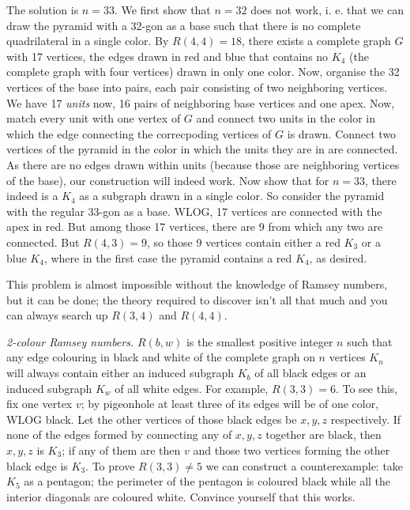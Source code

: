 \begin{solution}\hfil\medskip
  
    The solution is $n=\boxed{33}$.
    We first show that $n=32$ does not work, i. e. that we can draw the pyramid with a 32-gon as a base such that there is no complete quadrilateral in a single color. By $R(4,4)=18$, there exists a complete graph $G$ with 17 vertices, the edges drawn in red and blue that contains no $K_4$ (the complete graph with four vertices) drawn in only one color. Now, organise the 32 vertices of the base into pairs, each pair consisting of two neighboring vertices. We have 17 \emph{units} now, 16 pairs of neighboring base vertices and one apex. Now, match every unit with one vertex of $G$ and connect two units in the color in which the edge connecting the correcpoding vertices of $G$ is drawn. Connect two vertices of the pyramid in the color in which the units they are in are connected. As there are no edges drawn within units (because those are neighboring vertices of the base), our construction will indeed work.
    Now show that for $n=33$, there indeed is a $K_4$ as a subgraph drawn in a single color. So consider the pyramid with the regular 33-gon as a base. WLOG, 17 vertices are connected with the apex in red. But among those 17 vertices, there are 9 from which any two are connected. But $R(4,3)=9$, so those 9 vertices contain either a red $K_3$ or a blue $K_4$, where in the first case the pyramid contains a red $K_4$, as desired. \medskip

    This problem is almost impossible without the knowledge of Ramsey numbers, but it can be done; the theory required to discover isn't all that much and 
    you can always search up $R(3, 4)$ and $R(4, 4)$. \medskip

    \textit{2-colour Ramsey numbers.} $R(b, w)$ is the smallest positive integer $n$ such that any edge colouring in black and white of the complete graph on $n$ vertices
    $K_n$ will always contain either an induced subgraph $K_b$ of all black edges or an induced subgraph $K_w$ of all white edges. For example, $R(3, 3) = 6$. 
    To see this, fix one vertex $v$; by pigeonhole at least three of its edges will be of one color, WLOG black. Let the other vertices of those black edges
    be $x, y, z$ respectively. If none of the edges formed by connecting any of $x, y, z$ together are black, then $x, y, z$ is $K_3$; if any of them are then $v$
    and those two vertices forming the other black edge is $K_3$. To prove $R(3, 3) \neq 5$ we can construct a counterexample: take $K_5$ as a pentagon; the perimeter
    of the pentagon is coloured black while all the interior diagonals are coloured white. Convince yourself that this works. \medskip


\end{solution}
